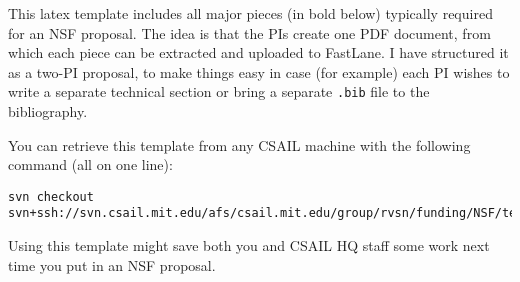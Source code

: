 This latex template includes all major pieces (in bold below) typically
required for an NSF proposal.  The idea is that the PIs create one PDF
document, from which each piece can be extracted and uploaded to FastLane.
I have structured it as a two-PI proposal, to make things easy in case
(for example) each PI wishes to write a separate technical section or 
bring a separate \verb+.bib+ file to the bibliography.

You can retrieve this template from any CSAIL machine with the following
command (all on one line):
\begin{verbatim}
svn checkout
svn+ssh://svn.csail.mit.edu/afs/csail.mit.edu/group/rvsn/funding/NSF/template
\end{verbatim}

Using this template might save both you and CSAIL HQ staff some work
next time you put in an NSF proposal.


